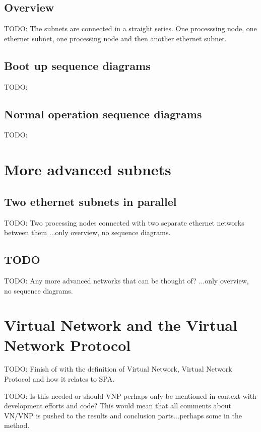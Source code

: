 \subsection{Overview}
TODO: The subnets are connected in a straight series. One processsing node, one
ethernet subnet, one processing node and then another ethernet subnet.

\subsection{Boot up sequence diagrams}
TODO:

\subsection{Normal operation sequence diagrams}
TODO:

\section{More advanced subnets}
\subsection{Two ethernet subnets in parallel}
TODO: Two processing nodes connected with two separate ethernet networks
between them ...only overview, no sequence diagrams.

\subsection{TODO}
TODO: Any more advanced networks that can be thought of? ...only overview, no
sequence diagrams.

\section{Virtual Network and the Virtual Network Protocol}
TODO: Finish of with the definition of Virtual Network, Virtual Network
Protocol and how it relates to SPA.

TODO: Is this needed or should VNP perhaps only be mentioned in context with
development efforts and code? This would mean that all comments about VN/VNP is
pushed to the results and conclusion parts...perhaps some in the method.
